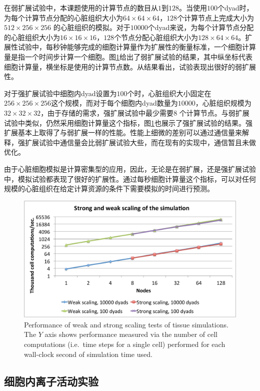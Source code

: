 在弱扩展试验中，本课题使用的计算节点的数目从$1$到$128$。当使用$100$个dyad时，为每个计算节点分配的心脏组织大小为$64\times64\times64$，$128$个计算节点上完成大小为$512\times256\times256$ 的心脏组织的模拟。对于$10000$个dyad来说，为每个计算节点分配的心脏组织大小为$16\times16\times16$，$128$个节点分配心脏组织大小为$128\times64\times64$。扩展性试验中，每秒钟能够完成的细胞计算量作为扩展性的衡量标准，一个细胞计算量是指一个时间步计算一个细胞。图\ref{scaling1}给出了弱扩展试验的结果，其中纵坐标代表细胞计算量，横坐标是使用的计算节点数。从结果看出，试验表现出很好的弱扩展性。

对于强扩展试验中细胞内dyad设置为$100$个时，心脏组织大小固定在$256\times256\times256$这个规模，而对于每个细胞内dyad数量为$10000$，心脏组织规模为$32\times32\times32$，由于存储的需求，强扩展试验中最少需要$8$ 个计算节点。与弱扩展试验中类似，仍然采用细胞计算量这个指标，图\ref{scaling1}也展示了强扩展试验的结果。强扩展基本上取得了与弱扩展一样的性能。性能上细微的差别可以通过通信量来解释，强扩展试验中通信量会比弱扩展试验大些，而在现有的实现中，通信暂且未做优化。

由于心脏细胞模拟是计算密集型的应用，因此，无论是在弱扩展，还是强扩展试验中，模拟试验都表现了很好的扩展性。通过每秒细胞计算量这个指标，可以对任何规模的心脏组织在给定计算资源的条件下需要模拟的时间进行预测。

\begin{figure}[htb]
\center
\includegraphics[width=\textwidth]{figs/scaling.pdf}
\caption{Performance of weak and strong scaling tests of tissue simulations. The $Y$ axis shows performance measured via the number of cell computations (i.e.~time steps for a single cell) performed for each wall-clock second of simulation time used. }
\label{scaling1}
\end{figure} 


\subsection{细胞内离子活动实验}

